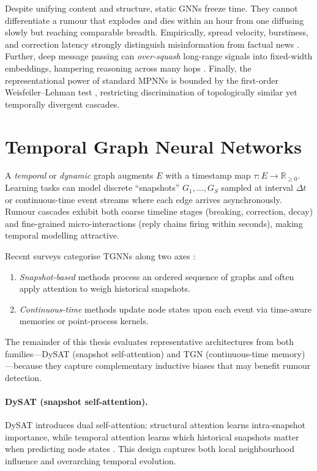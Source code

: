 \documentclass{cshonours}
\begin{document}
Despite unifying content and structure, static GNNs freeze time.  They cannot differentiate a rumour that explodes and dies within an hour from one diffusing slowly but reaching comparable breadth.  Empirically, spread velocity, burstiness, and correction latency strongly distinguish misinformation from factual news \cite{vosoughi2018spread}.  Further, deep message passing can \emph{over-squash} long-range signals into fixed-width embeddings, hampering reasoning across many hops \cite{oversquashing_gnn_2025}.  Finally, the representational power of standard MPNNs is bounded by the first-order Weisfeiler–Lehman test \cite{xu2019gin}, restricting discrimination of topologically similar yet temporally divergent cascades.


\section{Temporal Graph Neural Networks}


A \emph{temporal} or \emph{dynamic} graph augments \(E\) with a timestamp map  
\(\tau:E\!\to\!\mathbb{R}_{\ge0}\).  
Learning tasks can model discrete “snapshots” \(G_1,\dots,G_S\) sampled at interval \(\Delta t\) or continuous-time event streams where each edge arrives asynchronously.  Rumour cascades exhibit both coarse timeline stages (breaking, correction, decay) and fine-grained micro-interactions (reply chains firing within seconds), making temporal modelling attractive.


Recent surveys categorise TGNNs along two axes \cite{dynamic_gnn_survey_2024}:  

\begin{enumerate}
\item \emph{Snapshot-based} methods process an ordered sequence of graphs and often apply attention to weigh historical snapshots.  
\item \emph{Continuous-time} methods update node states upon each event via time-aware memories or point-process kernels.
\end{enumerate}

The remainder of this thesis evaluates representative architectures from both families—DySAT (snapshot self-attention) and TGN (continuous-time memory)—because they capture complementary inductive biases that may benefit rumour detection.

\paragraph{DySAT (snapshot self-attention).}
DySAT introduces dual self-attention:  
structural attention learns intra-snapshot importance, while temporal attention learns which historical snapshots matter when predicting node states \cite{sankar2020dysat}.  
This design captures both local neighbourhood influence and overarching temporal evolution.
\end{document}
